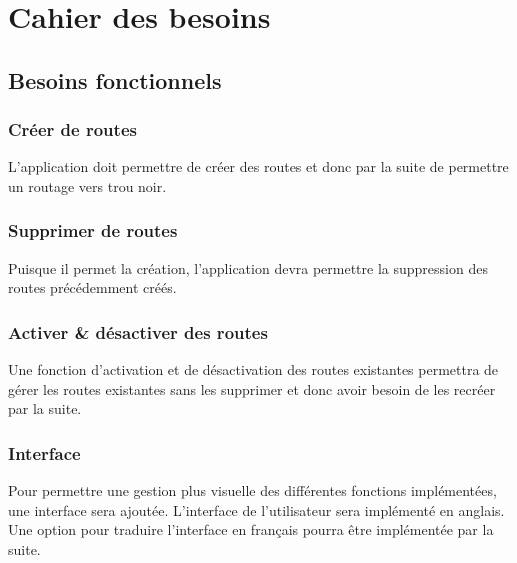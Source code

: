 \chapter{Cahier des besoins}

\section{Besoins fonctionnels}

\subsection{Créer de routes}L'application doit permettre de créer des routes et donc par la suite de permettre un routage vers trou noir.

\subsection{Supprimer de routes}Puisque il permet la création, l'application devra permettre la suppression des routes précédemment créés.

\subsection{Activer \& désactiver des routes}Une fonction d'activation et de désactivation des routes existantes permettra de gérer les routes existantes sans les supprimer et donc avoir besoin de les recréer par la suite.

\subsection{Interface}Pour permettre une gestion plus visuelle des différentes fonctions implémentées, une interface sera ajoutée. L'interface de l'utilisateur sera implémenté en anglais. Une option pour traduire l'interface en français pourra être implémentée par la suite.


\newpage



